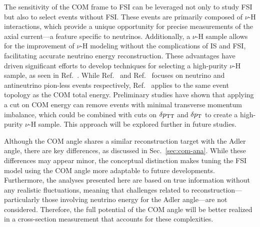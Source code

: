      The sensitivity of the COM frame to FSI can be leveraged not only to study FSI but also to select events without FSI. 
     These events are primarily composed of $\nu$-H interactions, which provide a unique opportunity for precise measurements of the axial current—a feature specific to neutrinos. 
     Additionally, a $\nu$-H sample allows for the improvement of $\nu$-H modeling without the complications of IS and FSI, facilitating accurate neutrino energy reconstruction. 
     These advantages have driven significant efforts to develop techniques for selecting a high-purity $\nu$-H sample, as seen in Ref.~\cite{Lu:2015hea,MINERvA:2023avz,Baudis:2023tma}.
     While Ref.~\cite{Baudis:2023tma} and Ref.~\cite{MINERvA:2023avz} focuses on neutrino and antineutrino pion-less events respectively, Ref.~\cite{Lu:2015hea} applies to the same event topology as the COM total energy. 
     Preliminary studies have shown that applying a cut on COM energy can remove events with minimal transverse momentum imbalance, which could be combined with cuts on $\delta p_\textrm{TT}$ and $\delta p_\textrm{T}$ to create a high-purity $\nu$-H sample. 
     This approach will be explored further in future studies.

     Although the COM angle shares a similar reconstruction target with the Adler angle, there are key differences, as discussed in Sec.~\ref{sec:com-ana}. 
     While these differences may appear minor, the conceptual distinction makes tuning the FSI model using the COM angle more adaptable to future developments. 
     Furthermore, the analyses presented here are based on true information without any realistic fluctuations, meaning that challenges related to reconstruction—particularly those involving neutrino energy for the Adler angle—are not considered. 
     Therefore, the full potential of the COM angle will be better realized in a cross-section measurement that accounts for these complexities.

